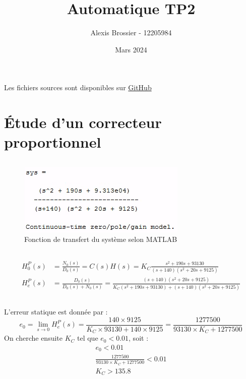 \documentclass{article}
\title{Automatique TP2}
\author{Alexis Brossier - 12205984}
\date{Mars 2024}
\begin{document}
\maketitle

Les fichiers sources sont disponibles sur \href{https://github.com/AL3X-69/GEP2014L/blob/master/tp2.m}{GitHub}

\section{Étude d'un correcteur proportionnel}
\subsection{}
\begin{figure}[h]
    \centering
    \includegraphics[width=0.5\linewidth]{zpk211.png}
    \caption{Fonction de transfert du système selon MATLAB}
    \label{fig:zpk211}
\end{figure}
\subsection{}
\begin{align*}
    H_0^P(s)&=\frac{N_0(s)}{D_0(s)}=C(s)H(s)=K_C\frac{s^2+190s+93130}{(s+140)(s^2+20s+9125)}\\
    H_e^P(s)&=\frac{D_0(s)}{D_0(s)+N_0(s)}=\frac{(s+140)(s^2+20s+9125)}{K_C(s^2+190s+93130)+(s+140)(s^2+20s+9125)}
\end{align*}
\subsection{}
L'erreur statique est donnée par :
\begin{equation*}
    e_0=\lim_{s\rightarrow0}H_e^P(s)=\frac{140\times9125}{K_C\times93130+140\times9125}=\frac{1277500}{93130\times K_C+1277500}
\end{equation*}
On cherche ensuite $K_C$ tel que $e_0<0.01$, soit :
\begin{gather*}
    e_0<0.01\\
    \frac{1277500}{93130\times K_C+1277500}<0.01\\
    K_C>135.8
\end{gather*}
\end{document}
